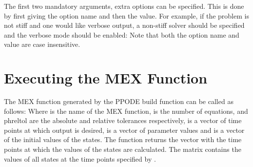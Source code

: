The first two mandatory arguments, extra options can be specified. This is done by first giving the option name and then the value. For example, if the problem is not stiff and one would like verbose output, a non-stiff solver should be specified and the verbose mode should be enabled:
Note that both the option name and value are case insensitive.

\section[Execution]{Executing the MEX Function}
The MEX function generated by the PPODE build function can be called as follows:
Where  is the name of the MEX function,  is the number of equations,  and ph{reltol} are the absolute and relative tolerances respectively,  is a vector of time points at which output is desired,  is a vector of parameter values and  is a vector of the initial values of the states. The function returns the vector  with the time points at which the values of the states are calculated. The matrix  contains the values of all states at the time points specified by .